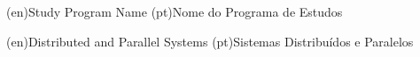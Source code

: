 %
%
%
%
\ntdegreename*(en){Study Program Name}          %
\ntdegreename*(pt){Nome do Programa de Estudos} %



%
%
%
%
\ntspecialization*(en){Distributed and Parallel Systems}         %
\ntspecialization*(pt){Sistemas Distribuídos e Paralelos} %



%
%
%
%
%
%






